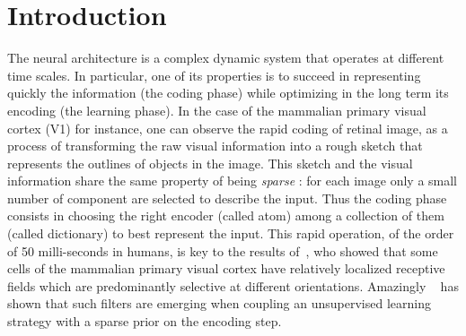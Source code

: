 \documentclass[a4paper, 11pt, draft]{article} %
\title{\Title}
\author{%
\FirstNameA\ \AuthorA \and \FirstNameB\ \AuthorB \and \FirstNameC\ \AuthorC
}
\date{\Institute\ \\
\Organism\
}
\newcommand{\Abstract}{
The formation of structure in the brain, that is, of the connection between cells within neural populations, is by large an unsupervised learning process: The emergence of this architecture is mostly self-organized. In the primary visual cortex of mammals, for example, one may observe during development the emergence of cells selective to localized, oriented features. This leads to the development of a rough representation of contours of the retinal image in area V1.
We modeled these representations using sparse unsupervised learning algorithms.
These algorithms alternate a coding phase to encode the information with a learning phase to find the proper encoder. A major difficulty faced by these types of algorithms is to deduce good representation while  knowing immature encoders, and to learn good encoders with a non-optimal representation
To address this problem, we propose here to introduce a new regulation process between learning and coding, called homeostasis. Our homeostasis is compatible with a neuromimetic architecture and
 allows for the fast emergence of localized filters sensitive to orientation
The key to this algorithm lies in a simple yet optimal mechanism of homeostasis that reconciles the antagonistic processes that occur at the coding and learning time scales.
We tested this unsupervised algorithm with this homeostasis rule for a range of existing unsupervised learning algorithms coupled with different neural coding algorithms. In addition, we propose a simplification of this optimal homeostasis rule by implementing a simple heuristic on the probability of activation of neurones. Compared to the optimal homeostasis rule, we show that this heuristic allows to implement an even faster unsupervised learning algorithm while keeping a large part of its effectiveness. These results demonstrate the potential application of such a strategy to the fast classification of images, for example in hierarchical and dynamic architectures.
}
\begin{document}
%
\maketitle
\begin{abstract}
\Abstract
\end{abstract}
\thispagestyle{empty}
\section{Introduction}\label{introduction}
The neural architecture is a complex dynamic system that operates at different time scales. In particular, one of its properties is to succeed in representing quickly the information (the coding phase) while optimizing in the long term its encoding (the learning phase).
 In the case of the mammalian primary visual cortex (V1) for instance, one can observe the rapid coding of retinal image, as a process of transforming the raw visual information into a rough sketch that represents the outlines of objects in the image.
This sketch and the visual information share the same property of being \emph{sparse} : for each image only a small number of component are selected to describe the input. Thus the coding phase consists in choosing the right encoder (called atom) among a collection of them (called dictionary) to  best represent the input. 
This rapid operation, of the order of 50 milli-seconds in humans, is key to the results of~\citet{Hubel68}, who showed that some cells of the mammalian primary visual cortex have relatively localized receptive fields which are predominantly selective at different orientations. 
Amazingly  ~\citet{Olshausen96} has shown that such filters are emerging when coupling an unsupervised learning strategy with a sparse prior on the encoding step.
\end{document}
